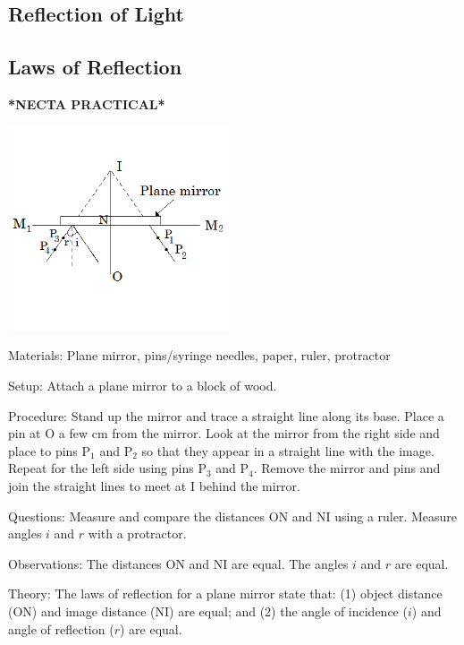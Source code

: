 \begin{multicols}{2}
\vfill
\columnbreak


\section*{Reflection of Light}  


\subsection{Laws of Reflection} 
\textbf{*NECTA PRACTICAL*}

\begin{center}
\includegraphics[width=0.49\textwidth]{./img/plane-mirror-prac.png}
\end{center}

\begin{description*}
\item[Materials:]{Plane mirror, pins/syringe needles, paper, ruler, protractor}
\item[Setup:]{Attach a plane mirror to a block of wood.}
\item[Procedure:]{Stand up the mirror and trace a straight line along its base. Place a pin at O a few cm from the mirror. Look at the mirror from the right side and place to pins P$_1$ and P$_2$ so that they appear in a straight line with the image. Repeat for the left side using pins P$_3$ and P$_4$. Remove the mirror and pins and join the straight lines to meet at I behind the mirror.}
\item[Questions:]{Measure and compare the distances ON and NI using a ruler. Measure angles $i$ and $r$ with a protractor.}
\item[Observations:]{The distances ON and NI are equal. The angles $i$ and $r$ are equal.}
\item[Theory:]{The laws of reflection for a plane mirror state that: (1) object distance (ON) and image distance (NI) are equal; and (2) the angle of incidence ($i$) and angle of reflection ($r$) are equal.}
\end{description*}


\end{multicols}
